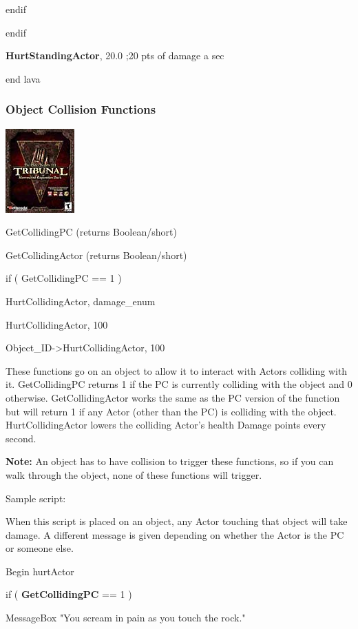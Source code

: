 \documentclass[
]{article}
\begin{document}
endif

endif

\textbf{HurtStandingActor}, 20.0 ;20 pts of damage a sec

end lava

\hypertarget{object-collision-functions}{%
\subsubsection{Object Collision
Functions}\label{object-collision-functions}}

\includegraphics{media/image6.png}

GetCollidingPC (returns Boolean/short)

GetCollidingActor (returns Boolean/short)

if ( GetCollidingPC == 1 )

HurtCollidingActor, damage\_enum

HurtCollidingActor, 100

Object\_ID-\textgreater HurtCollidingActor, 100

These functions go on an object to allow it to interact with Actors
colliding with it. GetCollidingPC returns 1 if the PC is currently
colliding with the object and 0 otherwise. GetCollidingActor works the
same as the PC version of the function but will return 1 if any Actor
(other than the PC) is colliding with the object. HurtCollidingActor
lowers the colliding Actor's health Damage points every second.

\textbf{Note:} An object has to have collision to trigger these
functions, so if you can walk through the object, none of these
functions will trigger.

Sample script:

When this script is placed on an object, any Actor touching that object
will take damage. A different message is given depending on whether the
Actor is the PC or someone else.

Begin hurtActor

if ( \textbf{GetCollidingPC} == 1 )

MessageBox "You scream in pain as you touch the rock."
\end{document}

